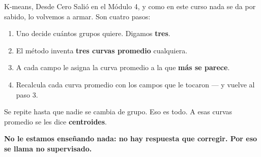 \documentclass[aspectratio=169, 11pt]{beamer}
\begin{document}
\begin{frame}[shrink=20]{K-means, Desde Cero}
  \vspace{3pt}
  {\footnotesize\color{textMuted}
   Salió en el Módulo 4, y como en este curso nada se da por sabido, lo
   volvemos a armar. Son cuatro pasos:}
  \vspace{3pt}
  {\footnotesize\color{textMuted}
  \begin{enumerate}\setlength{\itemsep}{3pt}
    \item Uno decide cuántos grupos quiere. Digamos \textbf{tres}.
    \item El método inventa \textbf{tres curvas promedio} cualquiera.
    \item A cada campo le asigna la curva promedio a la que \textbf{más se
          parece}.
    \item Recalcula cada curva promedio con los campos que le tocaron
          --- y vuelve al paso 3.
  \end{enumerate}}
  \vspace{3pt}
  {\footnotesize\color{textMuted}
   Se repite hasta que nadie se cambia de grupo. Eso es todo. A esas curvas
   promedio se les dice \textbf{centroides}.}
  \vspace{3pt}
  \begin{tcolorbox}[colback=arcaGray, colframe=arcaDark, boxrule=0pt,
    leftrule=3pt, arc=3pt, left=9pt, right=9pt, top=5pt, bottom=5pt]
    {\footnotesize\color{arcaDark}\bfseries
     No le estamos enseñando nada: no hay respuesta que corregir. Por eso se
     llama \textbf{no supervisado}.}
  \end{tcolorbox}
\end{frame}
\end{document}
